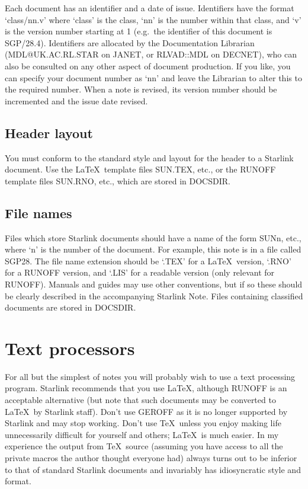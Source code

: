 Each document has an identifier and a date of issue.
Identifiers have the format `class/nn.v' where `class' is the class,
`nn' is the number within that class, and `v' is the version number starting
at 1 (e.g.\ the identifier of this document is SGP/28.4).
Identifiers are allocated by the Documentation Librarian
(MDL@UK.AC.RL.STAR on JANET, or RLVAD::MDL on DECNET), who can also be
consulted on any other aspect of document production.
If you like, you can specify your document number as `nn' and leave the
Librarian to alter this to the required number.
When a note is revised, its version number should be incremented and the issue
date revised.

\subsection{Header layout}

You must conform to the standard style and layout for the header to a Starlink
document.
Use the \LaTeX\ template files SUN.TEX, etc., or the RUNOFF template files
SUN.RNO, etc., which are stored in DOCSDIR.

\subsection{File names}

Files which store Starlink documents should have a name of the form SUNn, etc.,
where `n' is the number of the document.
For example, this note is in a file called SGP28.
The file name extension should be `.TEX' for a \LaTeX\ version, `.RNO' for a
RUNOFF version, and `.LIS' for a readable version (only relevant for RUNOFF).
Manuals and guides may use other conventions, but if so these should be
clearly described in the accompanying Starlink Note.
Files containing classified documents are stored in DOCSDIR.

\section{Text processors}

For all but the simplest of notes you will probably wish to use a text
processing program.
Starlink recommends that you use {\LaTeX}, although RUNOFF is an acceptable
alternative (but note that such documents may be converted to \LaTeX\ by
Starlink staff).
Don't use GEROFF as it is no longer supported by Starlink and may stop
working.
Don't use \TeX\ unless you enjoy making life unnecessarily difficult for
yourself and others; \LaTeX\ is much easier.
In my experience the output from \TeX\ source (assuming you have access to all
the private macros the author thought everyone had) always turns out to be
inferior to that of standard Starlink documents and invariably has idiosyncratic
style and format.

